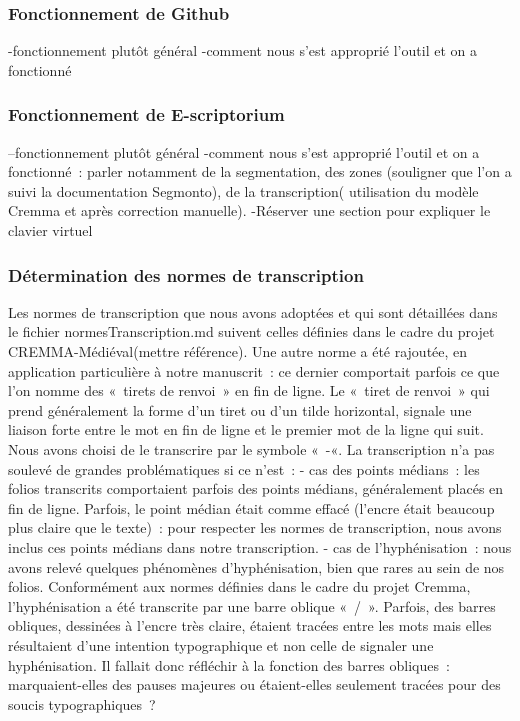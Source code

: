 \documentclass[12pt,a4paper,oneside,titlepage]{article} %
\begin{document}
\subsubsection{Fonctionnement de Github}
-fonctionnement plutôt général
-comment nous s’est approprié l’outil et on a fonctionné
\subsubsection{Fonctionnement de E-scriptorium}
--fonctionnement plutôt général
-comment nous s’est approprié l’outil et on a fonctionné : parler notamment de la segmentation, des zones (souligner que l’on a suivi la documentation Segmonto), de la transcription( utilisation du modèle Cremma et après correction manuelle).
-Réserver une section pour expliquer le clavier virtuel
\subsubsection{Détermination des normes de transcription}
Les normes de transcription que nous avons adoptées et qui sont détaillées dans le fichier normesTranscription.md suivent celles définies dans le cadre du projet CREMMA-Médiéval(mettre référence). Une autre norme a été rajoutée, en application particulière à notre manuscrit : ce dernier comportait parfois ce que l’on nomme des « tirets de renvoi » en fin de ligne. Le « tiret de renvoi » qui prend  généralement la forme d’un tiret ou d’un tilde horizontal, signale une liaison forte entre le mot en fin de ligne et  le premier mot de la ligne qui suit. Nous avons choisi de le transcrire par le symbole « -«.  
La transcription n’a pas soulevé de grandes problématiques si ce n’est :
- cas des points médians : les folios transcrits comportaient parfois des points médians, généralement placés en fin de ligne. Parfois, le point médian était comme effacé (l’encre était beaucoup plus claire que le texte) : pour respecter les normes de transcription, nous avons inclus ces points médians dans notre transcription.
- cas de l’hyphénisation : nous avons relevé quelques phénomènes d’hyphénisation, bien que rares au sein de nos folios. Conformément aux normes définies dans le cadre du projet Cremma, l’hyphénisation a été transcrite par une barre oblique « / ». Parfois, des barres obliques, dessinées à l’encre très claire, étaient tracées entre les mots mais elles résultaient d’une intention typographique et non celle de signaler une hyphénisation. Il fallait donc réfléchir à la fonction des barres obliques : marquaient-elles des pauses majeures ou étaient-elles seulement tracées pour des soucis typographiques ?
\end{document}
